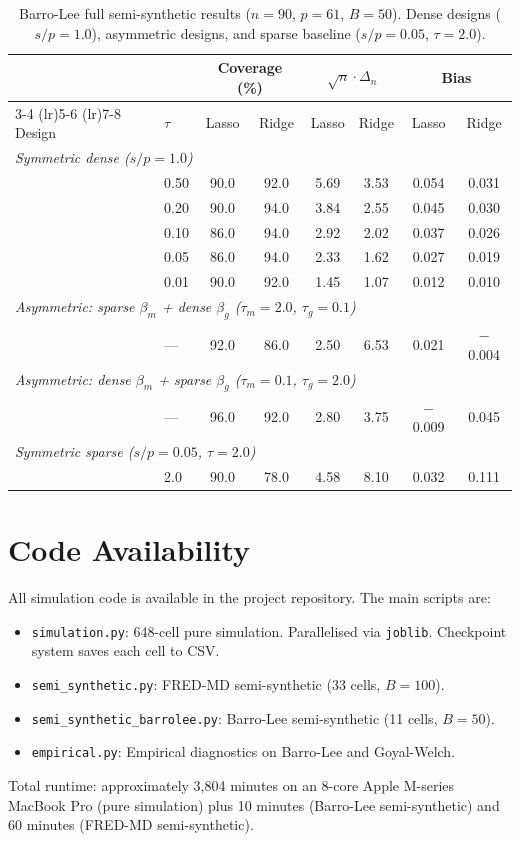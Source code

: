\documentclass[a4paper,10.5pt]{article}
\begin{document}
\begin{table}[H]
\centering
\small
\caption{Barro-Lee full semi-synthetic results ($n = 90$, $p = 61$, $B = 50$). Dense designs ($s/p = 1.0$), asymmetric designs, and sparse baseline ($s/p = 0.05$, $\tau = 2.0$).}
\label{tab:app_barrolee_full}
\begin{tabular}{llcccccc}
\toprule
& & \multicolumn{2}{c}{Coverage (\%)} & \multicolumn{2}{c}{$\sqrt{n}\cdot\Delta_n$} & \multicolumn{2}{c}{Bias} \\
\cmidrule(lr){3-4} \cmidrule(lr){5-6} \cmidrule(lr){7-8}
Design & $\tau$ & Lasso & Ridge & Lasso & Ridge & Lasso & Ridge \\
\midrule
\multicolumn{8}{l}{\textit{Symmetric dense ($s/p = 1.0$)}} \\
 & 0.50 & 90.0 & 92.0 & 5.69 & 3.53 & 0.054 & 0.031 \\
 & 0.20 & 90.0 & 94.0 & 3.84 & 2.55 & 0.045 & 0.030 \\
 & 0.10 & 86.0 & 94.0 & 2.92 & 2.02 & 0.037 & 0.026 \\
 & 0.05 & 86.0 & 94.0 & 2.33 & 1.62 & 0.027 & 0.019 \\
 & 0.01 & 90.0 & 92.0 & 1.45 & 1.07 & 0.012 & 0.010 \\
\midrule
\multicolumn{8}{l}{\textit{Asymmetric: sparse $\beta_m$ + dense $\beta_g$ ($\tau_m = 2.0$, $\tau_g = 0.1$)}} \\
 & --- & 92.0 & 86.0 & 2.50 & 6.53 & 0.021 & $-$0.004 \\
\midrule
\multicolumn{8}{l}{\textit{Asymmetric: dense $\beta_m$ + sparse $\beta_g$ ($\tau_m = 0.1$, $\tau_g = 2.0$)}} \\
 & --- & 96.0 & 92.0 & 2.80 & 3.75 & $-$0.009 & 0.045 \\
\midrule
\multicolumn{8}{l}{\textit{Symmetric sparse ($s/p = 0.05$, $\tau = 2.0$)}} \\
 & 2.0 & 90.0 & 78.0 & 4.58 & 8.10 & 0.032 & 0.111 \\
\bottomrule
\end{tabular}
\end{table}


\section{Code Availability}\label{app:code}

All simulation code is available in the project repository. The main scripts are:

\begin{itemize}[leftmargin=*]
    \item \texttt{simulation.py}: 648-cell pure simulation. Parallelised via \texttt{joblib}. Checkpoint system saves each cell to CSV.
    \item \texttt{semi\_synthetic.py}: FRED-MD semi-synthetic (33 cells, $B = 100$).
    \item \texttt{semi\_synthetic\_barrolee.py}: Barro-Lee semi-synthetic (11 cells, $B = 50$).
    \item \texttt{empirical.py}: Empirical diagnostics on Barro-Lee and Goyal-Welch.
\end{itemize}

\noindent Total runtime: approximately 3,804 minutes on an 8-core Apple M-series MacBook Pro (pure simulation) plus 10 minutes (Barro-Lee semi-synthetic) and 60 minutes (FRED-MD semi-synthetic).
\end{document}
